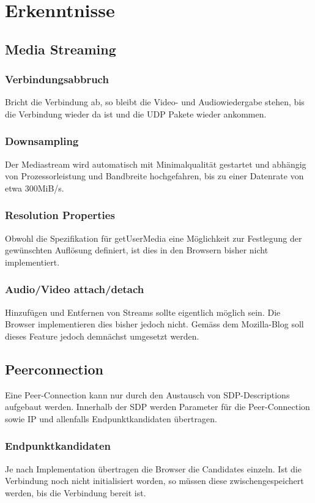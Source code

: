 \chapter{Erkenntnisse}
	\section{Media Streaming}
		\subsection{Verbindungsabbruch}
			Bricht die Verbindung ab, so bleibt die Video- und Audiowiedergabe stehen, bis die Verbindung wieder da ist und die UDP Pakete wieder ankommen.
		
		\subsection{Downsampling}
	 		Der Mediastream wird automatisch mit Minimalqualität gestartet und abhängig
	 		von Prozessorleistung und Bandbreite hochgefahren, bis zu einer Datenrate von etwa 300MiB/s.
	 		
	 	\subsection{Resolution Properties}
	 		Obwohl die Spezifikation für getUserMedia eine Möglichkeit zur Festlegung der gewünschten Auflösung definiert, ist dies in den Browsern bisher nicht implementiert.
	 		
	 	\subsection{Audio/Video attach/detach}
	 		Hinzufügen und Entfernen von Streams sollte eigentlich möglich sein. Die
	 		Browser implementieren dies bisher jedoch nicht. Gemäss dem Mozilla-Blog soll dieses Feature jedoch demnächst umgesetzt werden.
	 	
	 \section{Peerconnection}
	 	Eine Peer-Connection kann nur durch den Austausch von SDP-Descriptions
	 	aufgebaut werden. Innerhalb der SDP werden Parameter für die Peer-Connection
	 	sowie IP und allenfalls Endpunktkandidaten übertragen.
	 	
	 	\subsection{Endpunktkandidaten}
	 	Je nach Implementation übertragen die Browser die Candidates einzeln. Ist die
	 	Verbindung noch nicht initialisiert worden, so müssen diese
	 	zwischengespeichert werden, bis die Verbindung bereit ist.

